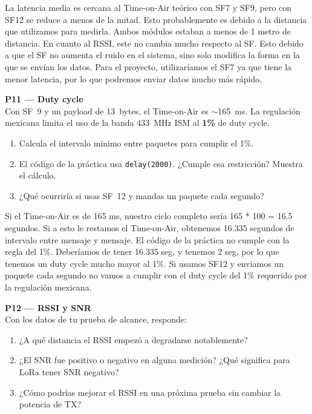 \documentclass[11pt, letterpaper]{article}
\newenvironment{pregunta}[1]{%
  \begin{mdframed}[backgroundcolor=purpleLight, linecolor=purpleMain, linewidth=1pt,
    innerleftmargin=12pt, innerrightmargin=12pt,
    innertopmargin=8pt,  innerbottommargin=8pt]
  \textbf{\color{purpleMain}#1}\\[6pt]
}{\end{mdframed}\vspace{0.2cm}}
\begin{document}
La latencia media es cercana al Time-on-Air teórico con SF7 y SF9, pero con SF12 se reduce a menos de la mitad. Esto probablemente es debido a la distancia que utilizamos para medirla. Ambos módulos estaban a menos de 1 metro de distancia.
En cuanto al RSSI, este no cambia mucho respecto al SF. Esto debido a que el SF no aumenta el ruido en el sistema, sino solo modifica la forma en la que se envían los datos.
Para el proyecto, utilizaríamos el SF7 ya que tiene la menor latencia, por lo que podremos enviar datos mucho más rápido.

\vspace{0.4cm}

\begin{pregunta}{P11 --- Duty cycle}
  Con SF~9 y un payload de 13~bytes, el Time-on-Air es $\sim$165~ms.
  La regulaci\'on mexicana limita el uso de la banda 433~MHz ISM
  al \textbf{1\%} de duty cycle.
  \begin{enumerate}[leftmargin=1.5cm, label=\alph*)]
    \item Calcula el intervalo m\'inimo entre paquetes para cumplir el 1\%.
    \item El c\'odigo de la pr\'actica usa \texttt{delay(2000)}.
          ¿Cumple esa restricci\'on? Muestra el c\'alculo.
    \item ¿Qu\'e ocurrir\'ia si usas SF~12 y mandas un paquete cada segundo?
  \end{enumerate}
\end{pregunta}

Si el Time-on-Air es de 165 ms, nuestro ciclo completo sería 165 * 100 = 16.5 segundos. Si a esto le restamos el Time-on-Air, obtenemos 16.335 segundos de intervalo entre mensaje y mensaje.
El código de la práctica no cumple con la regla del 1\%. Deberíamos de tener 16.335 seg, y tenemos 2 seg, por lo que tenemos un duty cycle mucho mayor al 1\%.
Si usamos SF12 y enviamos un paquete cada segundo no vamos a cumplir con el duty cycle del 1\% requerido por la regulación mexicana.

\vspace{0.4cm}

\begin{pregunta}{P12 --- RSSI y SNR}
  Con los datos de tu prueba de alcance, responde:
  \begin{enumerate}[leftmargin=1.5cm, label=\alph*)]
    \item ¿A qu\'e distancia el RSSI empez\'o a degradarse notablemente?
    \item ¿El SNR fue positivo o negativo en alguna medici\'on?
          ¿Qu\'e significa para LoRa tener SNR negativo?
    \item ¿C\'omo podr\'ias mejorar el RSSI en una pr\'oxima prueba
          sin cambiar la potencia de TX?
  \end{enumerate}
\end{pregunta}
\end{document}
